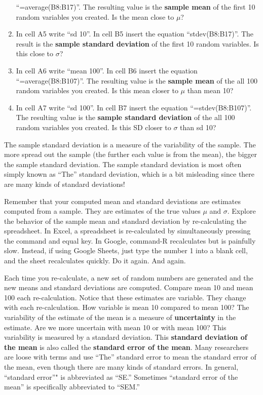 \documentclass[]{book}
\begin{document}
\begin{enumerate}
  ``=average(B8:B17)''. The resulting value is the \textbf{sample mean}
  of the first 10 random variables you created. Is the mean close to
  \(\mu\)?
\item
  In cell A5 write ``sd 10''. In cell B5 insert the equation
  ``stdev(B8:B17)''. The result is the \textbf{sample standard
  deviation} of the first 10 random variables. Is this close to
  \(\sigma\)?
\item
  In cell A6 write ``mean 100''. In cell B6 insert the equation
  ``=average(B8:B107)''. The resulting value is the \textbf{sample mean}
  of the all 100 random variables you created. Is this mean closer to
  \(\mu\) than mean 10?
\item
  In cell A7 write ``sd 100''. In cell B7 insert the equation
  ``=stdev(B8:B107)''. The resulting value is the \textbf{sample
  standard deviation} of the all 100 random variables you created. Is
  this SD closer to \(\sigma\) than sd 10?
\end{enumerate}

The sample standard deviation is a measure of the variability of the
sample. The more spread out the sample (the further each value is from
the mean), the bigger the sample standard deviation. The sample standard
deviation is most often simply known as ``The'' standard deviation,
which is a bit misleading since there are many kinds of standard
deviations!

Remember that your computed mean and standard deviations are estimates
computed from a sample. They are estimates of the true values \(\mu\)
and \(\sigma\). Explore the behavior of the sample mean and standard
deviation by re-calculating the spreadsheet. In Excel, a spreadsheet is
re-calculated by simultaneously pressing the command and equal key. In
Google, command-R recalculates but is painfully slow. Instead, if using
Google Sheets, just type the number 1 into a blank cell, and the sheet
recalculates quickly. Do it again. And again.

Each time you re-calculate, a new set of random numbers are generated
and the new means and standard deviations are computed. Compare mean 10
and mean 100 each re-calculation. Notice that these estimates are
variable. They change with each re-calculation. How variable is mean 10
compared to mean 100? The variability of the estimate of the mean is a
measure of \textbf{uncertainty} in the estimate. Are we more uncertain
with mean 10 or with mean 100? This variability is measured by a
standard deviation. This \textbf{standard deviation of the mean} is also
called the \textbf{standard error of the mean}. Many researchers are
loose with terms and use ``The'' standard error to mean the standard
error of the mean, even though there are many kinds of standard errors.
In general, ``standard error''" is abbreviated as ``SE.'' Sometimes
``standard error of the mean'' is specifically abbreviated to ``SEM.''
\end{document}
